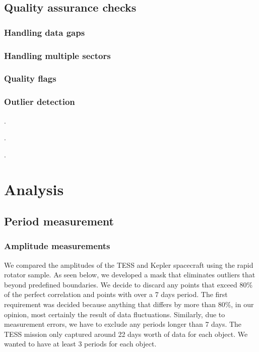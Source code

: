 \documentclass[modern]{aastex631}
\begin{document}
\subsection{Quality assurance checks}

\subsubsection{Handling data gaps}

\subsubsection{Handling multiple sectors}

\subsubsection{Quality flags}

\subsubsection{Outlier detection}

.

.

.


\section{Analysis}

\subsection{Period measurement}


\subsubsection{Amplitude measurements}

We compared the amplitudes of the TESS and Kepler spacecraft using the rapid rotator sample. As seen below, we developed a mask that eliminates outliers that beyond predefined boundaries. We decide to discard any points that exceed 80\% of the perfect correlation and points with over a 7 days period. The first requirement was decided because anything that differs by more than 80\%, in our opinion, most certainly the result of data fluctuations. Similarly, due to measurement errors, we have to exclude any periods longer than 7 days. The TESS mission only captured around 22 days worth of data for each object. We wanted to have at least 3 periods for each object.
\end{document}
